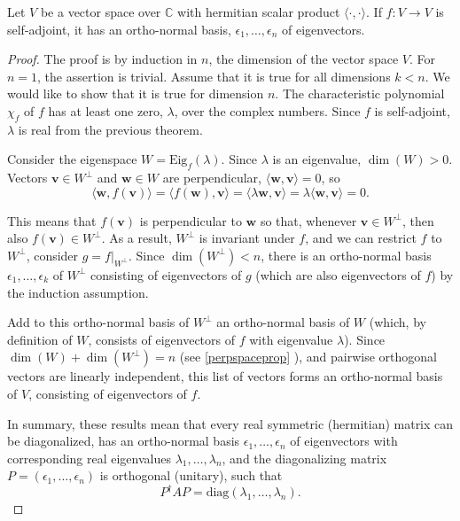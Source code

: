 \documentclass[a4paper,12pt]{report}
\begin{document}
\begin{theorem}
    Let $V$ be a vector space over $\mathbb{C}$ with hermitian scalar product $\langle \cdot, \cdot \rangle$. If $f : V \to V$ is self-adjoint, it has an ortho-normal basis, $\epsilon_1, \ldots, \epsilon_n$ of eigenvectors.
\end{theorem}
    
\begin{proof}
The proof is by induction in $n$, the dimension of the vector space $V$. For $n = 1$, the assertion is trivial. Assume that it is true for all dimensions $k < n$. We would like to show that it is true for dimension $n$. The characteristic polynomial $\chi_f$ of $f$ has at least one zero, $\lambda$, over the complex numbers. Since $f$ is self-adjoint, $\lambda$ is real from the previous theorem. 
    
Consider the eigenspace $W = \text{Eig}_f(\lambda)$. Since $\lambda$ is an eigenvalue, $\dim(W) > 0$. Vectors $\mathbf{v} \in W^\perp$ and $\mathbf{w} \in W$ are perpendicular, $\langle \mathbf{w}, \mathbf{v} \rangle = 0$, so
\begin{equation}
\langle \mathbf{w}, f(\mathbf{v}) \rangle = \langle f(\mathbf{w}), \mathbf{v} \rangle = \langle \lambda \mathbf{w}, \mathbf{v} \rangle = \lambda \langle \mathbf{w}, \mathbf{v} \rangle = 0.
\end{equation}
    
This means that $f(\mathbf{v})$ is perpendicular to $\mathbf{w}$ so that, whenever $\mathbf{v} \in W^\perp$, then also $f(\mathbf{v}) \in W^\perp$. As a result, $W^\perp$ is invariant under $f$, and we can restrict $f$ to $W^\perp$, \ie consider $g = f|_{W^\perp}$. Since $\dim(W^\perp) < n$, there is an ortho-normal basis $\epsilon_1, \ldots, \epsilon_k$ of $W^\perp$ consisting of eigenvectors of $g$ (which are also eigenvectors of $f$) by the induction assumption. 
    
Add to this ortho-normal basis of $W^\perp$ an ortho-normal basis of $W$ (which, by definition of $W$, consists of eigenvectors of $f$ with eigenvalue $\lambda$). Since $\dim(W) + \dim(W^\perp) = n$ (see \cref{perpspaceprop} ), and pairwise orthogonal vectors are linearly independent, this list of vectors forms an ortho-normal basis of $V$, consisting of eigenvectors of $f$.
    
In summary, these results mean that every real symmetric (hermitian) matrix can be diagonalized, has an ortho-normal basis $\epsilon_1, \ldots, \epsilon_n$ of eigenvectors with corresponding real eigenvalues $\lambda_1, \ldots, \lambda_n$, and the diagonalizing matrix $P = (\epsilon_1, \ldots, \epsilon_n)$ is orthogonal (unitary), such that
\begin{equation}
P^\dagger AP = \text{diag}(\lambda_1, \ldots, \lambda_n).
\end{equation}
\end{proof}
    
\end{document}
